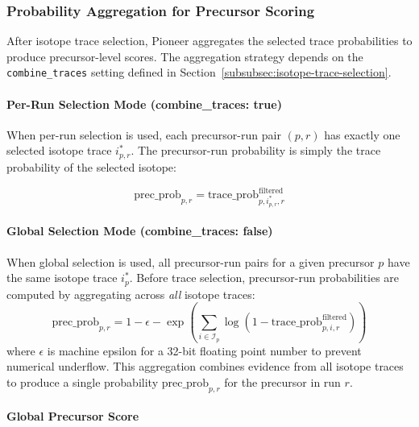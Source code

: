 \documentclass[pdflatex,sn-nature]{sn-jnl}
\begin{document}
\subsubsection{Probability Aggregation for Precursor Scoring}\label{subsubsec:probability-aggregation}

After isotope trace selection, Pioneer aggregates the selected trace probabilities to produce precursor-level scores. The aggregation strategy depends on the \texttt{combine\_traces} setting defined in Section~\ref{subsubsec:isotope-trace-selection}.

\paragraph{Per-Run Selection Mode (combine\_traces: true)}\label{para:per-run-aggregation}
When per-run selection is used, each precursor-run pair $(p,r)$ has exactly one selected isotope trace $i^*_{p,r}$. The precursor-run probability is simply the trace probability of the selected isotope:

\begin{equation}
  \text{prec\_prob}_{p,r} = \text{trace\_prob}_{p,i^*_{p,r},r}^{\text{filtered}}
\end{equation}


\paragraph{Global Selection Mode (combine\_traces: false)}\label{para:global-aggregation}
When global selection is used, all precursor-run pairs for a given precursor $p$ have the same isotope trace $i^*_p$. Before trace selection, precursor-run probabilities are computed by aggregating across \emph{all} isotope traces:
\begin{equation}
  \text{prec\_prob}_{p,r} = 1 - \epsilon - \exp\left(\sum_{i \in \mathcal{I}_p} \log(1 - \text{trace\_prob}_{p,i,r}^{\text{filtered}})\right)
\end{equation}
where $\epsilon$ is machine epsilon for a 32-bit floating point number to prevent numerical underflow. This aggregation combines evidence from all isotope traces to produce a single probability $\text{prec\_prob}_{p,r}$ for the precursor in run $r$.

\paragraph{Global Precursor Score}\label{para:global-precursor-score}
\end{document}

